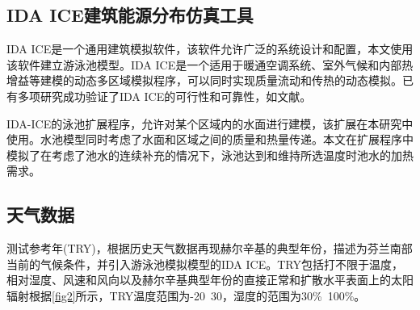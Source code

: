\documentclass[hyperref]{ctexart}
\begin{document}
\begin{multicols}{2}
		\subsection{IDA ICE建筑能源分布仿真工具}
		IDA ICE是一个通用建筑模拟软件，该软件允许广泛的系统设计和配置，本文使用该软件建立游泳池模型。IDA ICE是一个适用于暖通空调系统、室外气候和内部热增益等建模的动态多区域模拟程序，可以同时实现质量流动和传热的动态模拟。已有多项研究成功验证了IDA ICE的可行性和可靠性，如文献\cite{article32,article33,article34}。
		\par
		IDA-ICE的泳池扩展程序，允许对某个区域内的水面进行建模，该扩展在本研究中使用。水池模型同时考虑了水面和区域之间的质量和热量传递。本文在扩展程序中模拟了在考虑了池水的连续补充的情况下，泳池达到和维持所选温度时池水的加热需求。
		\par
		\subsection{天气数据}
		测试参考年(TRY)，根据历史天气数据再现赫尔辛基的典型年份，描述为芬兰南部当前的气候条件，并引入游泳池模拟模型\cite{article30}的IDA ICE。TRY包括打不限于温度，相对湿度、风速和风向以及赫尔辛基典型年份的直接正常和扩散水平表面上的太阳辐射根据\cref{fig2}所示，TRY温度范围为-20\textcelsius~30\textcelsius，湿度的范围为30\%~100\%。
		\par

\end{multicols}
\end{document}
